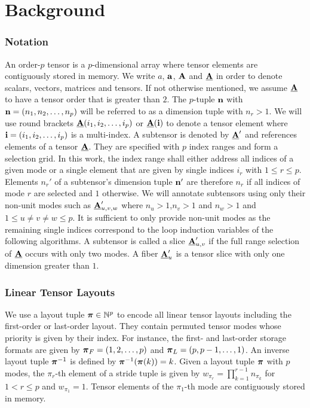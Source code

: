 \section{Background}
\label{sec:preliminaries}

\subsubsection{Notation}
\label{sec:preliminaries:notation}
An order-$p$ tensor is a $p$-dimensional array \cite{lim:2017:hypermatrices} where tensor elements are contiguously stored in memory. %
We write $a$, $\mathbf{a}$, $\mathbf{A}$ and $\underline{\mathbf{A}}$ in order to denote scalars, vectors, matrices and tensors. 
If not otherwise mentioned, we assume $\underline{\mathbf{A}}$ to have a tensor order that is greater than $2$.
The $p$-tuple $\mathbf{n}$ with $\mathbf{n} = (n_1,n_2,\dots,n_p)$ will be referred to as a dimension tuple with $n_r>1$.
We will use round brackets $\underline{\mathbf{A}}(i_1,i_2,\dots,i_p)$ or $\underline{\mathbf{A}}(\mathbf{i})$ to denote a tensor element where $\mathbf{i} = (i_1,i_2,\dots,i_p)$ is a multi-index.
A subtensor is denoted by $\underline{\mathbf{A}}'$ and references elements of a tensor $\underline{\mathbf{A}}$.
They are specified with $p$ index ranges and form a selection grid.
In this work, the index range shall either address all indices of a given mode or a single element that are given by single indices $i_r$ with $1 \leq r \leq p$. %
Elements $n_r'$ of a subtensor's dimension tuple $\mathbf{n}'$ are therefore $n_r$ if all indices of mode $r$ are selected and $1$ otherwise.
We will annotate subtensors using only their non-unit modes such as $\underline{\mathbf{A}}_{u,v,w}'$ where $n_u > 1$,$n_v > 1$ and $n_w >1$ and $1 \leq u \neq v \neq w \leq p$.
It is sufficient to only provide non-unit modes as the remaining single indices correspond to the loop induction variables of the following algorithms.
A subtensor is called a slice $\underline{\mathbf{A}}_{u,v}'$ if the full range selection of $\underline{\mathbf{A}}$ occurs with only two modes.
A fiber $\underline{\mathbf{A}}_u'$ is a tensor slice with only one dimension greater than $1$.


\subsubsection{Linear Tensor Layouts}
\label{sec:preliminaries:layout}
We use a layout tuple $\boldsymbol{\pi} \in \mathbb{N}^p$ to encode all linear tensor layouts including the first-order or last-order layout.
They contain permuted tensor modes whose priority is given by their index.
For instance, the first- and last-order storage formats are given by $\boldsymbol{\pi}_F = (1,2,\dots,p)$ and $\boldsymbol{\pi}_{L} = (p,p-1,\dots,1)$.
An inverse layout tuple $\boldsymbol{\pi}^{-1}$ is defined by $\boldsymbol{\pi}^{-1}(\boldsymbol{\pi}(k)) = k$.
Given a layout tuple $\boldsymbol{\pi}$ with $p$ modes, the $\pi_r$-th element of a stride tuple is given by $w_{\pi_r} = \prod_{k=1}^{r-1} n_{\pi_k}$ for $1 < r \leq p$ and $w_{\pi_1} = 1$.
Tensor elements of the $\pi_1$-th mode are contiguously stored in memory.

